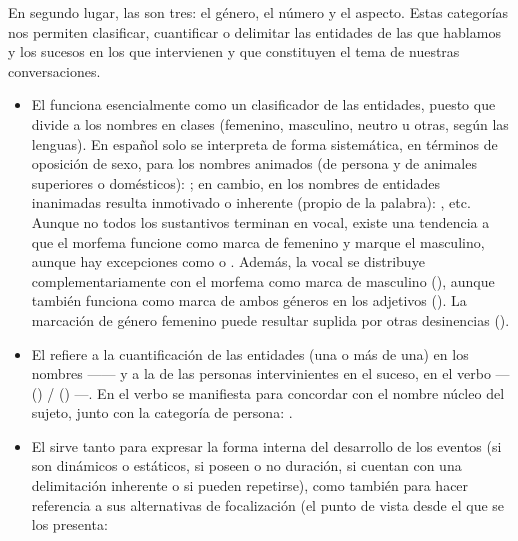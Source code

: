 En segundo lugar, las  son tres: el género, el
número y el aspecto. Estas categorías nos permiten clasificar, cuantificar o
delimitar las entidades de las que hablamos y los sucesos en los que intervienen
y que constituyen el tema de nuestras conversaciones.

\begin{itemize}
  \item El  funciona esencialmente como un clasificador de las
        entidades, puesto que divide a los nombres en clases (femenino,
        masculino, neutro u otras, según las lenguas). En español solo se
        interpreta de forma sistemática, en términos de oposición de sexo, para
        los nombres animados (de persona y de animales superiores o domésticos):
        ; en cambio, en los
        nombres de entidades inanimadas resulta inmotivado o inherente (propio
        de la palabra): , etc. Aunque no todos los
        sustantivos terminan en vocal, existe una tendencia a que el morfema
         funcione como marca de femenino y  marque el
        masculino, aunque hay excepciones como  o . Además, la vocal  se distribuye complementariamente con
        el morfema  como marca de masculino (),
        aunque también funciona como marca de ambos géneros en los adjetivos
        (). La marcación de género femenino puede
        resultar suplida por otras desinencias ().
  \item El  refiere a la cuantificación de las entidades (una o
        más de una) en los nombres ------ y a la de las
        personas intervinientes en el suceso, en el verbo ---()
         / () ---. En el verbo se
        manifiesta para concordar con el nombre núcleo del sujeto, junto con la
        categoría de persona: .
  \item El  sirve tanto para expresar la forma interna del
        desarrollo de los eventos (si son dinámicos o estáticos, si poseen o no
        duración, si cuentan con una delimitación inherente o si pueden
        repetirse), como también para hacer referencia a sus alternativas de
        focalización (el punto de vista desde el que se los presenta:

\end{itemize}
